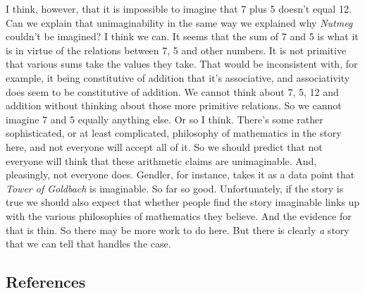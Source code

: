 \documentclass[
  11pt,
  letterpaper,
  DIV=11,
  numbers=noendperiod,
  twoside]{scrartcl}
\begin{document}
I think, however, that it is impossible to imagine that 7 plus 5 doesn't
equal 12. Can we explain that unimaginability in the same way we
explained why \emph{Nutmeg} couldn't be imagined? I think we can. It
seems that the sum of 7 and 5 is what it is in virtue of the relations
between 7, 5 and other numbers. It is not primitive that various sums
take the values they take. That would be inconsistent with, for example,
it being constitutive of addition that it's associative, and
associativity does seem to be constitutive of addition. We cannot think
about 7, 5, 12 and addition without thinking about those more primitive
relations. So we cannot imagine 7 and 5 equally anything else. Or so I
think. There's some rather sophisticated, or at least complicated,
philosophy of mathematics in the story here, and not everyone will
accept all of it. So we should predict that not everyone will think that
these arithmetic claims are unimaginable. And, pleasingly, not everyone
does. Gendler, for instance, takes it as a data point that \emph{Tower
of Goldbach} is imaginable. So far so good. Unfortunately, if the story
is true we should also expect that whether people find the story
imaginable links up with the various philosophies of mathematics they
believe. And the evidence for that is thin. So there may be more work to
do here. But there is clearly \emph{a} story that we can tell that
handles the case.

\subsection*{References}\label{references}
\end{document}
